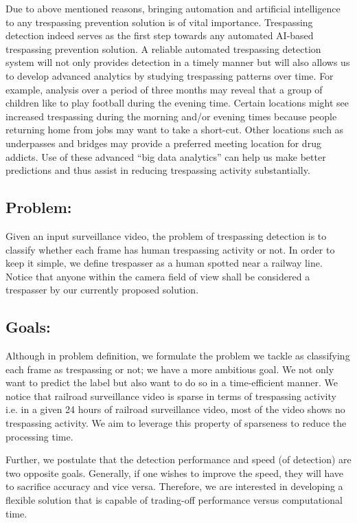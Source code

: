 Due to above mentioned reasons, bringing automation and artificial intelligence to any trespassing prevention solution is of vital importance. Trespassing detection indeed serves as the first step towards any automated AI-based trespassing prevention solution. A reliable automated trespassing detection system will not only provides detection in a timely manner but will also allows us to develop advanced analytics by studying trespassing patterns over time. For example, analysis over a period of three months may reveal that a group of children like to play football during the evening time. Certain locations might see increased trespassing during the morning and/or evening times because people returning home from jobs may want to take a short-cut. Other locations such as underpasses and bridges may provide a preferred meeting location for drug addicts. Use of these advanced ``big data analytics'' can help us make better predictions and thus assist in  reducing trespassing activity substantially.
\subsection{Problem:} Given an input surveillance video, the problem of trespassing detection is to classify whether each frame has human trespassing activity or not. In order to
keep it simple, we define trespasser as a human spotted near a railway line. Notice that anyone within the camera field of view shall be considered a trespasser by our currently proposed solution.
\subsection{Goals:} 
\label{sec:goal}
Although in problem definition, we formulate the problem we tackle as classifying each frame as trespassing or not; we have a more ambitious goal. We not only want to predict the label but also want to do so in a time-efficient manner. We notice that railroad surveillance video is sparse in terms of trespassing activity i.e. in a given 24 hours of railroad surveillance video, most of the video shows no trespassing activity. We aim to leverage this property of sparseness to reduce the processing time. 

Further, we postulate that the detection performance and speed (of detection) are two opposite goals. Generally, if one wishes to improve the speed, they will have to sacrifice accuracy and vice versa. Therefore, we are interested in developing a  flexible solution that is capable of trading-off performance versus computational time.